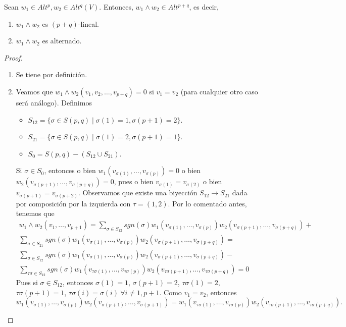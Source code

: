 \documentclass[CV.tex]{subfiles}
\begin{document}
\begin{lemma}
Sean $w_1\in Alt^p,w_2\in Alt^{q}(V)$. Entonces, $w_1\land w_2\in Alt^{p+q}$, es decir,
\begin{enumerate}
\item $w_1\land w_2$ es $(p+q)$-lineal.
\item $w_1\land w_2$ es alternado.
\end{enumerate}
\end{lemma}
\begin{proof}\
\begin{enumerate}
\item Se tiene por definición.
\item Veamos que $w_1\land w_2(v_1,v_2,\dots, v_{p+q})=0$ si $v_1=v_2$ (para cualquier otro caso será análogo). Definimos
\begin{itemize}
\item $S_{12}=\{\sigma\in S(p,q)\mid \sigma(1)=1,\sigma(p+1)=2\}$.
\item $S_{21}=\{\sigma\in S(p,q)\mid \sigma(1)=2,\sigma(p+1)=1\}$.
\item $S_0=S(p,q)-(S_{12}\cup S_{21})$.
\end{itemize}
Si $\sigma\in S_0$, entonces o bien $w_1(v_{\sigma(1)},\dots, v_{\sigma(p)})=0$ o bien $w_2(v_{\sigma(p+1)},\dots, v_{\sigma(p+q)})=0$, pues o bien $v_{\sigma(1)}=v_{\sigma(2)}$ o bien $v_{\sigma(p+1)}=v_{\sigma(p+2)}$.
Observamos que existe una biyección $S_{12}\to S_{21}$ dada por composición por la izquierda con $\tau=(1,2)$. Por lo comentado antes, tenemos que
\begin{gather*}
w_1\land w_2(v_1,\dots, v_{p+1})=\sum_{\sigma\in S_{12}}sgn(\sigma)w_1(v_{\sigma(1)},\dots, v_{\sigma(p)})w_2(v_{\sigma(p+1)},\dots,v_{\sigma(p+q)})+\\
\sum_{\sigma\in S_{21}}sgn(\sigma)w_1(v_{\sigma(1)},\dots, v_{\sigma(p)})w_2(v_{\sigma(p+1)},\dots,v_{\sigma(p+q)})=\\
\sum_{\sigma\in S_{12}}sgn(\sigma)w_1(v_{\sigma(1)},\dots, v_{\sigma(p)})w_2(v_{\sigma(p+1)},\dots,v_{\sigma(p+q)})-\\
\sum_{\tau\sigma\in S_{12}}sgn(\sigma)w_1(v_{\tau\sigma(1)},\dots, v_{\tau\sigma(p)})w_2(v_{\tau\sigma(p+1)},\dots,v_{\tau\sigma(p+q)})=0
\end{gather*}
Pues si $\sigma\in S_{12}$, entonces $\sigma(1)=1$, $\sigma(p+1)=2$, $\tau\sigma(1)=2$, $\tau\sigma(p+1)=1$, $\tau\sigma(i)=\sigma(i)\ \forall i\neq 1,p+1$. Como $v_1=v_2$, entonces $$w_1(v_{\sigma(1)},\dots,v_{\sigma(p)})w_2(v_{\sigma(p+1)},\dots, v_{\sigma(p+1)})=w_1(v_{\tau\sigma(1)},\dots, v_{\tau\sigma(p)})w_2(v_{\tau\sigma(p+1)},\dots, v_{\tau\sigma(p+q)}).$$
\end{enumerate}
\end{proof}
\end{document}
